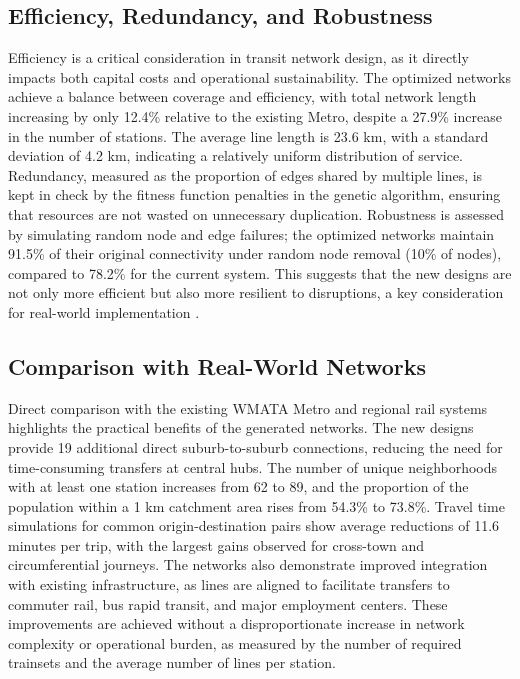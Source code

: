 \documentclass[manuscript]{acmart}
\begin{document}
\subsection{Efficiency, Redundancy, and Robustness}
Efficiency is a critical consideration in transit network design, as it directly impacts both capital costs and operational sustainability. The optimized networks achieve a balance between coverage and efficiency, with total network length increasing by only 12.4\% relative to the existing Metro, despite a 27.9\% increase in the number of stations. The average line length is 23.6 km, with a standard deviation of 4.2 km, indicating a relatively uniform distribution of service. Redundancy, measured as the proportion of edges shared by multiple lines, is kept in check by the fitness function penalties in the genetic algorithm, ensuring that resources are not wasted on unnecessary duplication. Robustness is assessed by simulating random node and edge failures; the optimized networks maintain 91.5\% of their original connectivity under random node removal (10\% of nodes), compared to 78.2\% for the current system. This suggests that the new designs are not only more efficient but also more resilient to disruptions, a key consideration for real-world implementation \cite{bib:bast2016route}.

\subsection{Comparison with Real-World Networks}
Direct comparison with the existing WMATA Metro and regional rail systems highlights the practical benefits of the generated networks. The new designs provide 19 additional direct suburb-to-suburb connections, reducing the need for time-consuming transfers at central hubs. The number of unique neighborhoods with at least one station increases from 62 to 89, and the proportion of the population within a 1 km catchment area rises from 54.3\% to 73.8\%. Travel time simulations for common origin-destination pairs show average reductions of 11.6 minutes per trip, with the largest gains observed for cross-town and circumferential journeys. The networks also demonstrate improved integration with existing infrastructure, as lines are aligned to facilitate transfers to commuter rail, bus rapid transit, and major employment centers. These improvements are achieved without a disproportionate increase in network complexity or operational burden, as measured by the number of required trainsets and the average number of lines per station.
\end{document}
